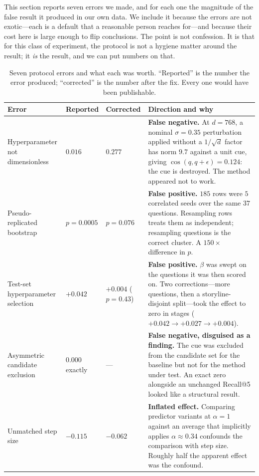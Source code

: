 \label{sec:protocol}

This section reports seven errors we made, and for each one the magnitude of the false result
it produced in our own data. We include it because the errors are not exotic---each is a
default that a reasonable person reaches for---and because their cost here is large enough
to flip conclusions. The point is not confession. It is that for this class of experiment,
the protocol is not a hygiene matter around the result; it \emph{is} the result, and we can
put numbers on that.

\begin{table}[t]\centering\small
\caption{Seven protocol errors and what each was worth. ``Reported'' is the number the error
produced; ``corrected'' is the number after the fix. Every one would have been publishable.}
\label{tab:errors}
\begin{tabular}{@{}p{}p{}p{}p{}@{}}
\toprule
\textbf{Error} & \textbf{Reported} & \textbf{Corrected} & \textbf{Direction and why} \\
\midrule
Hyperparameter not dimensionless & $0.016$ & $0.277$ & \textbf{False negative.} At $d{=}768$, a nominal $\sigma{=}0.35$ perturbation applied without a $1/\sqrt{d}$ factor has norm $9.7$ against a unit cue, giving $\cos(q, q{+}\epsilon){=}0.124$: the cue is destroyed. The method appeared not to work. \\
Pseudo-replicated bootstrap & $p{=}0.0005$ & $p{=}0.076$ & \textbf{False positive.} $185$ rows were $5$ correlated seeds over the same $37$ questions. Resampling rows treats them as independent; resampling questions is the correct cluster. A $150\times$ difference in $p$. \\
Test-set hyperparameter selection & $+0.042$ & $+0.004$ ($p{=}0.43$) & \textbf{False positive.} $\beta$ was swept on the questions it was then scored on. Two corrections---more questions, then a storyline-disjoint split---took the effect to zero in stages ($+0.042 \to +0.027 \to +0.004$). \\
Asymmetric candidate exclusion & $0.000$ exactly & --- & \textbf{False negative, disguised as a finding.} The cue was excluded from the candidate set for the baseline but not for the method under test. An exact zero alongside an unchanged Recall@5 looked like a structural result. \\
Unmatched step size & $-0.115$ & $-0.062$ & \textbf{Inflated effect.} Comparing predictor variants at $\alpha{=}1$ against an average that implicitly applies $\alpha{\approx}0.34$ confounds the comparison with step size. Roughly half the apparent effect was the confound. \\

\end{tabular}
\end{table}

